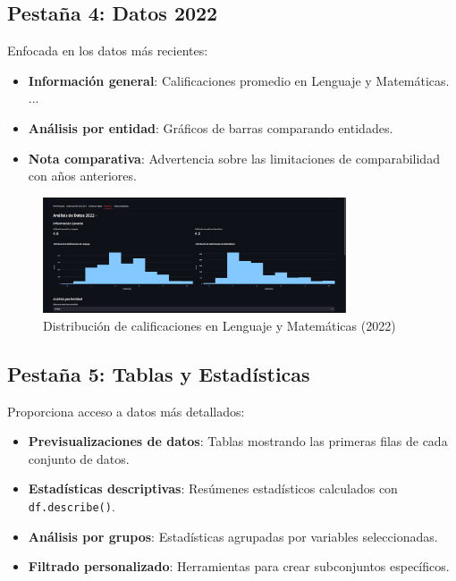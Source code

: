 \subsection{Pestaña 4: Datos 2022}
Enfocada en los datos más recientes:

\begin{itemize}
    \item \textbf{Información general}: Calificaciones promedio en Lenguaje y Matemáticas.
{{ ... }}
    \item \textbf{Análisis por entidad}: Gráficos de barras comparando entidades.
    \item \textbf{Nota comparativa}: Advertencia sobre las limitaciones de comparabilidad con años anteriores.
\end{itemize}

\begin{figure}[h]
    \centering
    \includegraphics[width=0.8\textwidth]{../imagenes/analisis 2022.png}
    \caption{Distribución de calificaciones en Lenguaje y Matemáticas (2022)}
    \label{fig:histograma_2022}
\end{figure}

\subsection{Pestaña 5: Tablas y Estadísticas}
Proporciona acceso a datos más detallados:

\begin{itemize}
    \item \textbf{Previsualizaciones de datos}: Tablas mostrando las primeras filas de cada conjunto de datos.
    \item \textbf{Estadísticas descriptivas}: Resúmenes estadísticos calculados con \texttt{df.describe()}.
    \item \textbf{Análisis por grupos}: Estadísticas agrupadas por variables seleccionadas.
    \item \textbf{Filtrado personalizado}: Herramientas para crear subconjuntos específicos.
\end{itemize}

